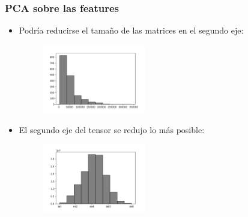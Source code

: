 \documentclass{beamer}
\theoremstyle{plain}
\numberwithin{equation}{section} %
\numberwithin{figure}{section} %
\numberwithin{table}{section} %
\begin{document}

\begin{frame}
\frametitle{PCA sobre las features}


\begin{itemize}
\justifying

\item Podr\'ia reducirse el tamaño de las matrices en el segundo eje:

\begin{figure}[H]
\includegraphics[height=30mm]{Histograma-duraciones.png}
\end{figure}

\item El segundo eje del tensor se redujo lo m\'as posible:

\begin{figure}[H]
\includegraphics[height=30mm]{Histograma-notas.png}
\end{figure}

\end{itemize}

\end{frame}

\end{document}
